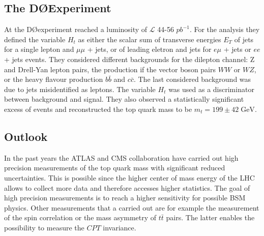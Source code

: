 \subsection{The D\O Experiment}
At the D\O \;experiment reached a luminosity of $\mathcal{L}$ 44-56 $pb^{-1}$. For the analysis they defined the variable $H_t$ as either the scalar sum of transverse energies $E_T$ of jets for a single lepton and $\mu\mu$ + jets, or of leading eletron and jets for $e\mu$ + jets or $ee$ + jets events.
They considered different backgrounds for the dilepton channel: Z and Drell-Yan lepton pairs, the production if the vector boson pairs $WW$ or $WZ$, or the heavy flavour production $b\bar{b}$ and $c\bar{c}$. The last considered background was due to jets misidentified as leptons. The variable $H_t$ was used as a discriminator between background and signal.
They also observed a statistically significant excess of events and reconstructed the top quark mass to be $m_{t} = 199 \pm 42 \;\si{\GeV} $.

\subsection*{Outlook}
In the past years the ATLAS and CMS collaboration have carried out high precision measurements of the top quark mass with significant reduced uncertainties. This is possible since the higher center of mass energy of the LHC allows to collect more data and therefore accesses higher statistics. The goal of high precision measurements is to reach a higher sensitivity for possible BSM physics. Other measurements that a carried out are for example the measurement of the spin correlation or the mass asymmetry of $t\bar{t}$ pairs. The latter enables the possibility to measure the $CPT$ invariance.
